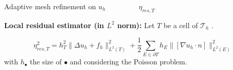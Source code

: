 \begin{frame}{Adaptive mesh refinement}
    \hspace{45pt}$\text{on }u_h\hspace{55pt}\eta_{res,T}$

    \vspace{8pt}
    \textbf{Local residual estimator (in $L^2$ norm):} Let $T$ be a cell of $\mathcal{T}_h$ .

    \vspace{-8pt}
    $$\eta_{res,T}^2 = h_T^2 \|\Delta u_h + f_h\|_{L^2(T)}^2 + \frac{1}{2} \sum_{E \in \partial T} h_E \|[\nabla u_h\cdot n]\|_{L^2(E)}^2$$
    with $h_\bullet$ the size of $\bullet$ and considering the Poisson problem.


\end{frame}

